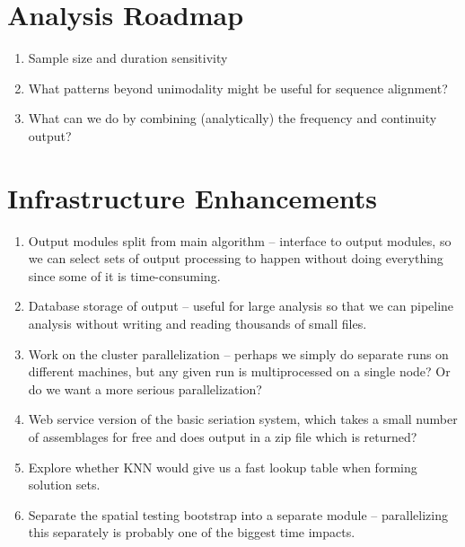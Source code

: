 \documentclass[preprint,times,authoryear,10pt]{elsarticle}
\begin{document}
\section{Analysis Roadmap}\label{analysis-roadmap}

\begin{enumerate}
\def\labelenumi{\arabic{enumi}.}
\itemsep1pt\parskip0pt
\item
  Sample size and duration sensitivity
\item
  What patterns beyond unimodality might be useful for sequence
  alignment?\\
\item
  What can we do by combining (analytically) the frequency and
  continuity output?
\end{enumerate}

\section{Infrastructure Enhancements}\label{infrastructure-enhancements}

\begin{enumerate}
\def\labelenumi{\arabic{enumi}.}
\itemsep1pt\parskip0pt
\item
  Output modules split from main algorithm -- interface to output
  modules, so we can select sets of output processing to happen without
  doing everything since some of it is time-consuming.
\item
  Database storage of output -- useful for large analysis so that we can
  pipeline analysis without writing and reading thousands of small
  files.
\item
  Work on the cluster parallelization -- perhaps we simply do separate
  runs on different machines, but any given run is multiprocessed on a
  single node? Or do we want a more serious parallelization?\\
\item
  Web service version of the basic seriation system, which takes a small
  number of assemblages for free and does output in a zip file which is
  returned?
\item
  Explore whether KNN would give us a fast lookup table when forming
  solution sets.\\
\item
  Separate the spatial testing bootstrap into a separate module --
  parallelizing this separately is probably one of the biggest time
  impacts.
\end{enumerate}
\end{document}
